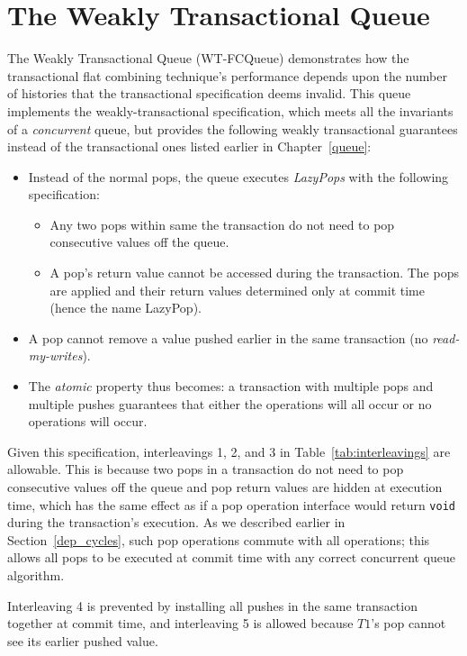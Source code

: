 \section{The Weakly Transactional Queue} 

The Weakly Transactional Queue (WT-FCQueue) demonstrates how the transactional flat combining technique's performance depends upon the number of histories that the transactional specification deems invalid. This queue implements the weakly-transactional specification, which meets all the invariants of a \emph{concurrent} queue, but provides the following weakly transactional guarantees instead of the transactional ones listed earlier in Chapter~\ref{queue}:
\begin{itemize}
    \item Instead of the normal pops, the queue executes \emph{LazyPops} with the following specification:
        \begin{itemize}
            \item Any two pops within same the transaction do not need to pop consecutive values off the queue.
            \item A pop's return value cannot be accessed during the transaction. The pops are applied and their return values determined only at commit time (hence the name LazyPop).
        \end{itemize}
    \item A pop cannot remove a value pushed earlier in the same transaction (no \emph{read-my-writes}).
    \item The \emph{atomic} property thus becomes: a transaction with multiple pops and multiple pushes guarantees that either the operations will all occur or no operations will occur.
\end{itemize}

Given this specification, interleavings 1, 2, and 3 in Table~\ref{tab:interleavings} are allowable. This is because two pops in a transaction do not need to pop consecutive values off the queue and pop return values are hidden at execution time, which has the same effect as if a pop operation interface would return \texttt{void} during the transaction's execution. As we described earlier in Section~\ref{dep_cycles}, such pop operations commute with all operations; this allows all pops to be executed at commit time with any correct concurrent queue algorithm.

Interleaving 4 is prevented by installing all pushes in the same transaction together at commit time, and interleaving 5 is allowed because $T1$'s pop cannot see its earlier pushed value.

